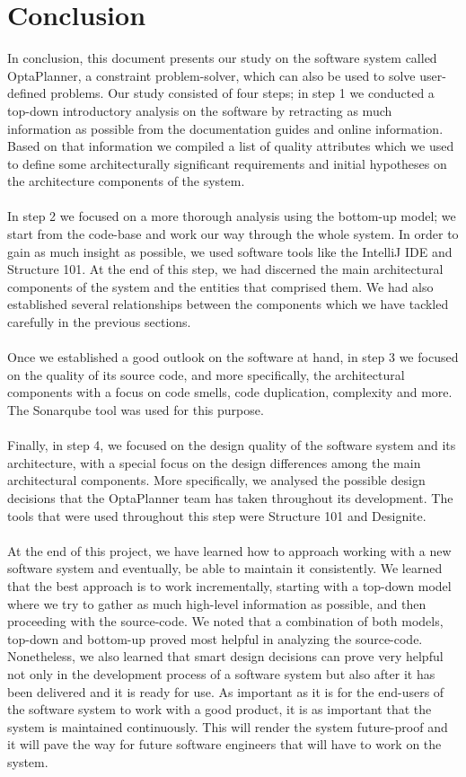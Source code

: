 \clearpage
\section{Conclusion}
In conclusion, this document presents our study on the software system called OptaPlanner, a constraint problem-solver, which can also be used to solve user-defined problems. Our study consisted of four steps; in step 1 we conducted a top-down introductory analysis on the software by retracting as much information as possible from the documentation guides and online information. Based on that information we compiled a list of quality attributes which we used to define some architecturally significant requirements and initial hypotheses on the architecture components of the system. \\\\
In step 2 we focused on a more thorough analysis using the bottom-up model; we start from the code-base and work our way through the whole system. In order to gain as much insight as possible, we used software tools like the IntelliJ IDE and Structure 101. At the end of this step, we had discerned the main architectural components of the system and the entities that comprised them. We had also established several relationships between the components which we have tackled carefully in the previous sections.\\\\
Once we established a good outlook on the software at hand, in step 3 we focused on the quality of its source code, and more specifically, the architectural components with a focus on code smells, code duplication, complexity and more. 
The Sonarqube tool was used for this purpose.\\\\
Finally, in step 4, we focused on the design quality of the software system and its architecture, with a special focus on the design differences among the main architectural components. More specifically, we analysed the possible design decisions that the OptaPlanner team has taken throughout its development. The tools that were used throughout this step were Structure 101 and Designite.\\\\
At the end of this project, we have learned how to approach working with a new software system and eventually, be able to maintain it consistently. We learned that the best approach is to work incrementally, starting with a top-down model where we try to gather as much high-level information as possible, and then proceeding with the source-code. We noted that a combination of both models, top-down and bottom-up proved most helpful in analyzing the source-code. Nonetheless, we also learned that smart design decisions can prove very helpful not only in the development process of a software system but also after it has been delivered and it is ready for use. As important as it is for the end-users of the software system to work with a good product, it is as important that the system is maintained continuously. This will render the system future-proof and it will pave the way for future software engineers that will have to work on the system.

